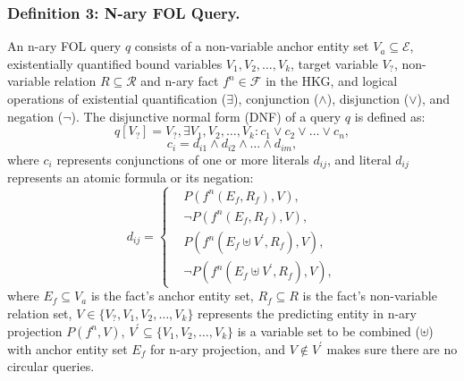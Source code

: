 \documentclass[letterpaper]{article} \usepackage{aaai23}  \usepackage{times}  \usepackage{helvet}  \usepackage{courier}  \usepackage[hyphens]{url}  \usepackage{graphicx} \urlstyle{rm} \def\UrlFont{\rm}  \usepackage{natbib}  \usepackage{caption} \frenchspacing  \setlength{\pdfpagewidth}{8.5in}  \setlength{\pdfpageheight}{11in}  \usepackage{algorithm}
\begin{document}
\subsubsection{Definition 3: N-ary FOL Query.} 
An n-ary FOL query $q$ consists of a non-variable anchor entity set $V_a \subseteq \mathcal{E}$, existentially quantified bound variables $V_1, V_2,\ldots, V_k$, target variable $V_?$, non-variable relation $R \subseteq \mathcal{R}$ and n-ary fact $f^n \in \mathcal{F}$ in the HKG, and logical operations of existential quantification ($\exists$), conjunction ($\wedge$), disjunction ($\vee$), and negation ($\neg$). The disjunctive normal form (DNF) of a query $q$ is defined as:
\begin{equation}
q[V_?]= V_?, \exists V_1,V_2,\ldots,V_k:c_1\vee c_2 \vee\ldots\vee c_n,
\end{equation}
\begin{equation}
c_i=d_{i1}\wedge d_{i2}\wedge\ldots\wedge d_{im},
\end{equation}
where $c_i$ represents conjunctions of one or more literals $d_{ij}$, and literal $d_{ij}$ represents an atomic formula or its negation:
\begin{equation}
d_{ij} = \left\{
\begin{aligned}
&P(f^n(E_f,R_f),V), \\
&\neg P(f^n(E_f,R_f),V),\\ 
&P(f^n(E_f\uplus V^{\prime}, R_f),V), \\
&\neg P(f^n(E_f\uplus V^{\prime}, R_f),V),
\end{aligned}
\right.
\end{equation}
where $E_f \subseteq V_a$ is the fact's anchor entity set, $R_f \subseteq R$ is the fact's non-variable relation set, $V \in \{V_?, V_1, V_2,\ldots, V_k\}$ represents the predicting entity in n-ary projection $P(f^n,V)$, $V^{\prime} \subseteq \{V_1, V_2,\ldots, V_k\}$ is a variable set to be combined ($\uplus$) with anchor entity set $E_f$ for n-ary projection, and $V \notin V^{\prime}$ makes sure there are no circular queries.
\end{document}
